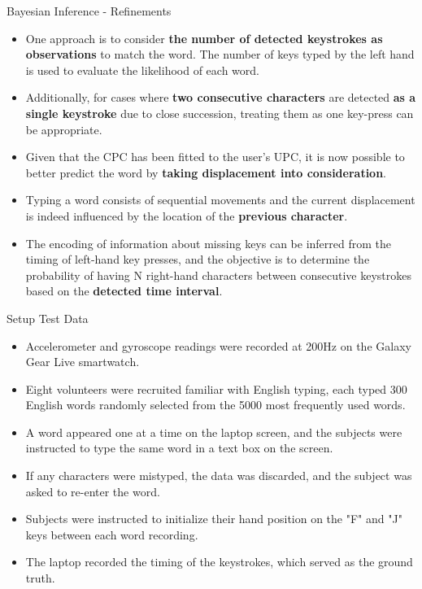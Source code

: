 \documentclass[ucs,9pt,usenames,dvipsnames]{beamer}
\begin{document}
\begin{frame}{Bayesian Inference - Refinements}
	\begin{itemize}
		\item One approach is to consider \textbf{the number of detected keystrokes as observations} to match the word. The number of keys typed by the left hand is used to evaluate the likelihood of each word. 
		\item Additionally, for cases where\textbf{ two consecutive characters} are detected \textbf{as a single keystroke} due to close succession, treating them as one key-press can be appropriate. %
		
		\item Given that the CPC has been fitted to
		the user’s UPC, it is now possible to better predict the word by \textbf{taking displacement into consideration}. 
		\item Typing a word consists of sequential movements
		and the current displacement is indeed influenced by the location of the \textbf{previous character}. 
		\item The encoding of information about missing keys can be inferred from the timing of left-hand key presses, and the objective is to determine the probability of having N right-hand characters between consecutive keystrokes based on the \textbf{detected time interval}.
	\end{itemize}
\end{frame}

\begin{frame}{Setup Test Data}
\begin{itemize}
	\item Accelerometer and gyroscope readings were recorded at 200Hz on the Galaxy Gear Live smartwatch.
	\item 	Eight volunteers were recruited familiar with English typing, each typed 300 English words randomly selected from the 5000 most frequently used words. %
	\item A word appeared one at a time on the laptop screen, and the subjects were instructed to type the same word in a text box on the screen.
	\item If any characters were mistyped, the data was discarded, and the subject was asked to re-enter the word. 
	\item Subjects were instructed to initialize their hand position on the "F" and "J" keys between each word recording. 
	\item The laptop recorded the timing of the keystrokes, which served as the ground truth.
\end{itemize}
\end{frame}
\end{document}
